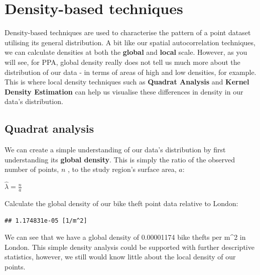 \documentclass[
]{book}
\newenvironment{Shaded}{\begin{snugshade}}{\end{snugshade}}
\newcommand{\CommentTok}[1]{\textcolor[rgb]{0.56,0.35,0.01}{\textit{#1}}}
\newcommand{\FunctionTok}[1]{\textcolor[rgb]{0.00,0.00,0.00}{#1}}
\newcommand{\NormalTok}[1]{#1}
\newcommand{\OtherTok}[1]{\textcolor[rgb]{0.56,0.35,0.01}{#1}}
\newcommand{\SpecialCharTok}[1]{\textcolor[rgb]{0.00,0.00,0.00}{#1}}
\begin{document}
\hypertarget{density-based-techniques}{%
\section{Density-based techniques}\label{density-based-techniques}}

Density-based techniques are used to characterise the pattern of a point dataset utilising its general distribution. A bit like our spatial autocorrelation techniques, we can calculate densities at both the \textbf{global} and \textbf{local} scale. However, as you will see, for PPA, global density really does not tell us much more about the distribution of our data - in terms of areas of high and low densities, for example. This is where local density techniques such as \textbf{Quadrat Analysis} and \textbf{Kernel Density Estimation} can help us visualise these differences in density in our data's distribution.

\hypertarget{quadrat-analysis}{%
\subsection{Quadrat analysis}\label{quadrat-analysis}}

We can create a simple understanding of our data's distribution by first understanding its \textbf{global density}. This is simply the ratio of the observed number of points, \(n\) , to the study region's surface area, \(a\):

\(\widehat{\lambda} =\frac{n}{a}\)

Calculate the global density of our bike theft point data relative to London:

\begin{Shaded}
\end{Shaded}

\begin{verbatim}
## 1.174831e-05 [1/m^2]
\end{verbatim}

We can see that we have a global density of 0.00001174 bike thefts per m\^{}2 in London. This simple density analysis could be supported with further descriptive statistics, however, we still would know little about the local density of our points.
\end{document}

